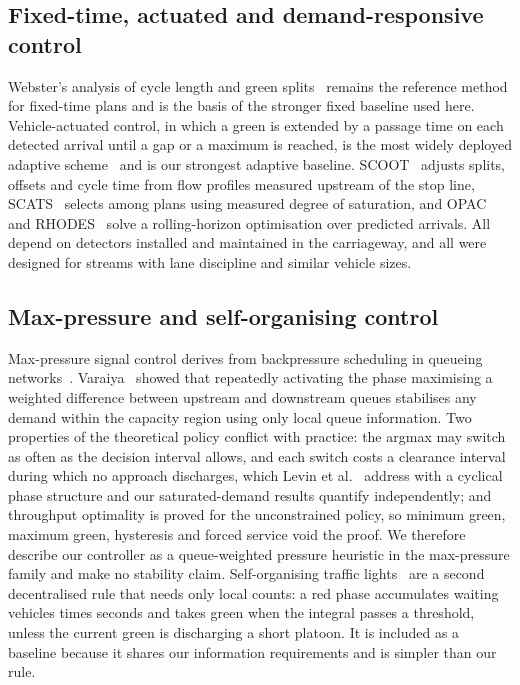 \documentclass[journal]{IEEEtran}
\begin{document}
\subsection{Fixed-time, actuated and demand-responsive control}

Webster's analysis of cycle length and green splits~\cite{Webster1958TrafficSignalSettings} remains the
reference method for fixed-time plans and is the basis of the stronger fixed baseline used here.
Vehicle-actuated control, in which a green is extended by a passage time on each detected arrival until a gap
or a maximum is reached, is the most widely deployed adaptive scheme~\cite{koonce2008timing} and is our
strongest adaptive baseline. SCOOT~\cite{Hunt1981SCOOT} adjusts splits, offsets and cycle time from flow
profiles measured upstream of the stop line, SCATS~\cite{Sims1980SCATS} selects among plans using measured
degree of saturation, and OPAC~\cite{Gartner1983OPAC} and RHODES~\cite{Mirchandani2001RHODES} solve a
rolling-horizon optimisation over predicted arrivals. All depend on detectors installed and maintained in the
carriageway, and all were designed for streams with lane discipline and similar vehicle sizes.

\subsection{Max-pressure and self-organising control}

Max-pressure signal control derives from backpressure scheduling in queueing networks~\cite{Tassiulas1992Stability}.
Varaiya~\cite{Varaiya2013MaxPressure} showed that repeatedly activating the phase
maximising a weighted difference between upstream and downstream queues stabilises any demand within the
capacity region using only local queue information. Two properties of the theoretical policy conflict with practice: the argmax may switch as often as the
decision interval allows, and each switch costs a clearance interval during which no approach discharges,
which Levin et al.~\cite{Levin2020CyclicalMaxPressure} address with a cyclical phase structure and our
saturated-demand results quantify independently; and throughput optimality is proved for the unconstrained
policy, so minimum green, maximum green, hysteresis and forced service void the proof. We therefore describe our controller as a queue-weighted pressure heuristic in the
max-pressure family and make no stability claim. Self-organising traffic
lights~\cite{gershenson2005sotl,cools2013sotl} are a second decentralised rule that needs only local counts: a
red phase accumulates waiting vehicles times seconds and takes green when the integral passes a threshold,
unless the current green is discharging a short platoon. It is included as a baseline because it shares our
information requirements and is simpler than our rule.
\end{document}
